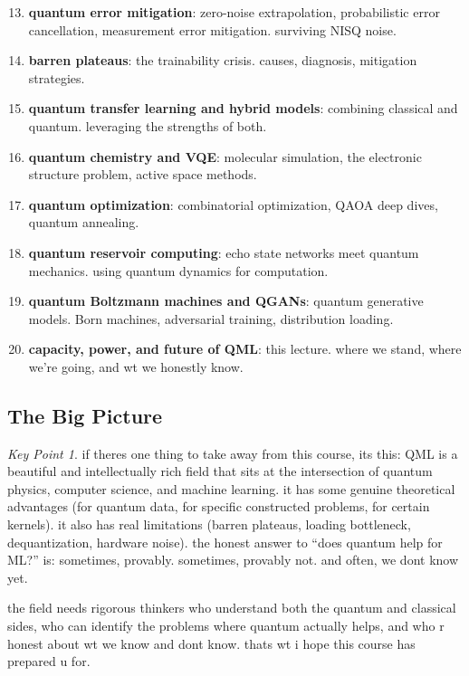 \documentclass[11pt,a4paper]{article}
\theoremstyle{definition}
\theoremstyle{remark}
\newtheorem*{keypoint}{Key Point}
\begin{document}
\begin{enumerate}[label=\textbf{Lec \arabic*:}]
    \setcounter{enumi}{12}
    \item \textbf{quantum error mitigation}: zero-noise extrapolation, probabilistic error cancellation, measurement error mitigation. surviving NISQ noise.

    \item \textbf{barren plateaus}: the trainability crisis. causes, diagnosis, mitigation strategies.

    \item \textbf{quantum transfer learning and hybrid models}: combining classical and quantum. leveraging the strengths of both.

    \item \textbf{quantum chemistry and VQE}: molecular simulation, the electronic structure problem, active space methods.

    \item \textbf{quantum optimization}: combinatorial optimization, QAOA deep dives, quantum annealing.

    \item \textbf{quantum reservoir computing}: echo state networks meet quantum mechanics. using quantum dynamics for computation.

    \item \textbf{quantum Boltzmann machines and QGANs}: quantum generative models. Born machines, adversarial training, distribution loading.

    \item \textbf{capacity, power, and future of QML}: this lecture. where we stand, where we're going, and wt we honestly know.
\end{enumerate}

\subsection{The Big Picture}

\begin{keypoint}
if theres one thing to take away from this course, its this: QML is a beautiful and intellectually rich field that sits at the intersection of quantum physics, computer science, and machine learning. it has some genuine theoretical advantages (for quantum data, for specific constructed problems, for certain kernels). it also has real limitations (barren plateaus, loading bottleneck, dequantization, hardware noise). the honest answer to ``does quantum help for ML?'' is: sometimes, provably. sometimes, provably not. and often, we dont know yet.

the field needs rigorous thinkers who understand both the quantum and classical sides, who can identify the problems where quantum actually helps, and who r honest about wt we know and dont know. thats wt i hope this course has prepared u for.
\end{keypoint}
\end{document}
